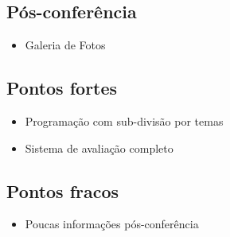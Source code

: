 \documentclass[letter]{article}
\begin{document}
\subsection{Pós-conferência}
\begin{itemize} 
\item Galeria de Fotos
\end{itemize}

\subsection{Pontos fortes}
\begin{itemize}
\item Programação com sub-divisão por temas
\item Sistema de avaliação completo
\end{itemize}

\subsection{Pontos fracos}
\begin{itemize}
\item Poucas informações pós-conferência
\end{itemize}
\end{document}
